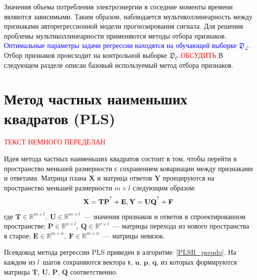 \documentclass[12pt,fleqn,unicode]{article}
\newcommand{\bY}{\mathbf{Y}}
\newcommand{\bX}{\mathbf{X}}
\newcommand{\bP}{\mathbf{P}}
\newcommand{\bT}{\mathbf{T}}
\newcommand{\bQ}{\mathbf{Q}}
\newcommand{\bE}{\mathbf{E}}
\newcommand{\bF}{\mathbf{F}}
\newcommand{\bU}{\mathbf{U}}
\newcommand{\T}{^{\text{\tiny\sffamily\upshape\mdseries T}}}
\begin{document}
Значения объема потребления электроэнергии в соседние моменты времени являются зависимыми.
Таким образом, наблюдается мультиколлинеарность между признаками авторегрессионной модели прогнозирования сигнала. 
Для решения проблемы мультиколлинеарности применяются методы отбора признаков. \textcolor{blue}{Оптимальные параметры задачи регрессии находятся на обучающей выборке $\mathfrak{D}_\mathcal{L}$.} Отбор признаков происходит на контрольной выборке $\mathfrak{D}_\mathcal{C}$.\textcolor{red}{ОБСУДИТЬ} В следующем разделе описан базовый используемый метод отбора признаков.

\newpage
\section{Метод частных наименьших квадратов (PLS)}
\textcolor{red}{ТЕКСТ НЕМНОГО ПЕРЕДЕЛАН}

Идея метода частных наименьших квадратов состоит в том, чтобы перейти в пространство меньшей размерности с сохранением ковариации между признаками и ответами. Матрица плана $\bX$ и матрица ответов $\bY$ проецируются на пространство меньшей размерности $m \times l$ следующим образом:
\begin{equation}
\label{pls_x_y}
    \bX = \bT \bP^{\T} + \bE,\\
    \bY = \bU \bQ^{\T} + \bF
\end{equation}
где $\bT \in \mathbb{R}^{m \times l},\ \bU \in \mathbb{R}^{m \times l}$~--- значения признаков и ответов в спроектированном пространстве; $\bP \in \mathbb{R}^{n \times l},\ \bQ \in \mathbb{R}^{r \times l}$~--- матрицы перехода из нового пространства в старое; $\bE\in \mathbb{R}^{m \times n},\ \bF \in \mathbb{R}^{m \times n}$~--- матрицы невязок. 

Псевдокод метода регрессии PLS приведен в алгоритме~\ref{PLSR_pseudo}. На каждом из $l$~шагов сохраняются вектора $\mathbf{t}$, $\mathbf{u}$, $\mathbf{p}$, $\mathbf{q}$, из которых формируются матрицы $\mathbf{T}$, $\mathbf{U}$, $\mathbf{P}$, $\mathbf{Q}$ соответственно.
\end{document}
